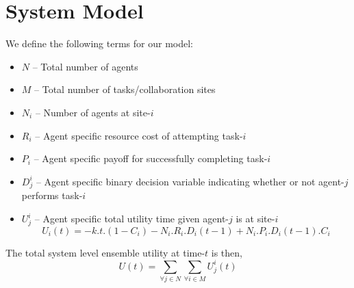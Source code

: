 \documentclass[conference]{IEEETran}
\begin{document}
\section{System Model}
We define the following terms for our model:
\begin{itemize}
	\item $N$   -- Total number of agents
	\item $M$   -- Total number of tasks/collaboration sites
	\item $N_i$ -- Number of agents at site-$i$
	\item $R_i$ -- Agent specific resource cost of attempting task-$i$
	\item $P_i$ -- Agent specific payoff for successfully completing task-$i$
	\item $D_j^i$ -- Agent specific binary decision variable indicating whether or not agent-$j$ performs task-$i$
	\item $U_j^i$ -- Agent specific total utility time given agent-$j$ is at site-$i$
	\begin{equation}
		U_i(t) = -k.t.(1 - C_i) - N_i.R_i.D_i(t-1) + N_i.P_i.D_i(t-1).C_i
	\end{equation}
\end{itemize}


The total system level ensemble utility at time-$t$ is then,
\begin{equation}
	U(t) = \sum\limits_{\forall j \in N}\sum\limits_{\forall i \in M} U_j^i(t)
\end{equation}
\end{document}
